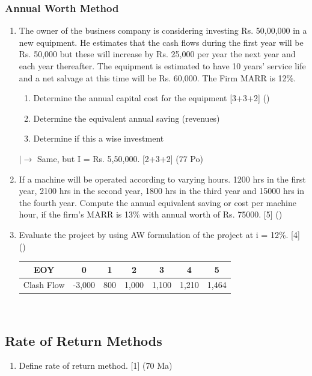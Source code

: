 \documentclass[12pt]{article}
\begin{document}
		\subsubsection{Annual Worth Method}
			\begin{enumerate}[noitemsep, topsep = 0pt]
				\item The owner of the business company is considering investing Rs. 50,00,000 in a new equipment. He estimates that the cash flows during the first year will be Rs. 50,000 but these will increase by Rs. 25,000 per year the next year and each year thereafter. The equipment is estimated to have 10 years' service life and a net salvage at this time will be Rs. 60,000. The Firm MARR is 12\%.
				\begin{enumerate}[noitemsep, topsep = 0pt, label = \alph*]
					\item Determine the annual capital cost for the equipment \hfill [3+3+2] ()
					\item Determine the equivalent annual saving (revenues)
					\item Determine if this a wise investment
				\end{enumerate}
				$\left|\rightarrow\right.$ Same, but I = Rs. 5,50,000. \hfill [2+3+2] (77 Po)
				
				\item If a machine will be operated according to varying hours. 1200 hrs in the first year, 2100 hrs in the second year, 1800 hrs in the third year and 15000 hrs in the fourth year. Compute the annual equivalent saving or cost per machine hour, if the firm's MARR is 13\% with annual worth of Rs. 75000. \hfill [5] ()
				
				\item Evaluate the project by using AW formulation of the project at i = 12\%. \hfill [4] ()\\
				\begin{tabular}{|c|c|c|c|c|c|c|}
					\hline
					EOY & 0 & 1 & 2 & 3 & 4 & 5\\ \hline
					Clash Flow & -3,000 & 800 & 1,000 & 1,100 & 1,210 & 1,464\\ \hline
				\end{tabular}\\[0pt]
			\end{enumerate}

	\subsection{Rate of Return Methods}
		\begin{enumerate} [noitemsep, topsep = 0pt]
			\item Define rate of return method. \hfill [1] (70 Ma)
		\end{enumerate}
    
\end{document}
